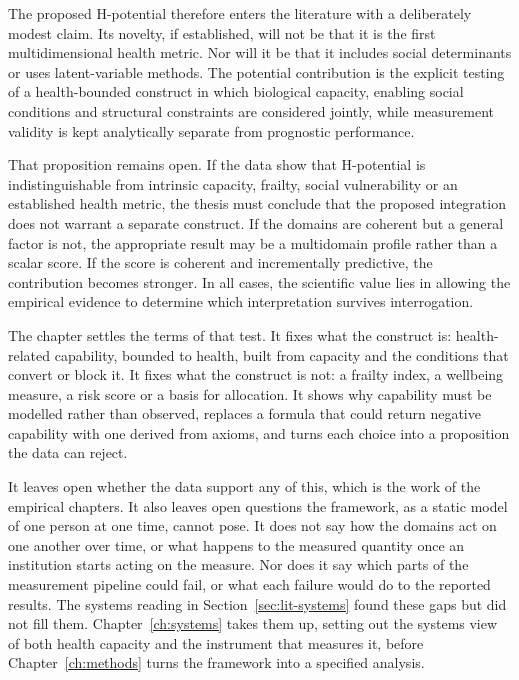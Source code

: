 The proposed H-potential therefore enters the literature with a deliberately modest claim. Its novelty, if established, will not be that it is the first multidimensional health metric. Nor will it be that it includes social determinants or uses latent-variable methods. The potential contribution is the explicit testing of a health-bounded construct in which biological capacity, enabling social conditions and structural constraints are considered jointly, while measurement validity is kept analytically separate from prognostic performance.

That proposition remains open. If the data show that H-potential is indistinguishable from intrinsic capacity, frailty, social vulnerability or an established health metric, the thesis must conclude that the proposed integration does not warrant a separate construct. If the domains are coherent but a general factor is not, the appropriate result may be a multidomain profile rather than a scalar score. If the score is coherent and incrementally predictive, the contribution becomes stronger. In all cases, the scientific value lies in allowing the empirical evidence to determine which interpretation survives interrogation.

The chapter settles the terms of that test. It fixes what the construct is: health-related capability, bounded to health, built from capacity and the conditions that convert or block it. It fixes what the construct is not: a frailty index, a wellbeing measure, a risk score or a basis for allocation. It shows why capability must be modelled rather than observed, replaces a formula that could return negative capability with one derived from axioms, and turns each choice into a proposition the data can reject.

It leaves open whether the data support any of this, which is the work of the empirical chapters. It also leaves open questions the framework, as a static model of one person at one time, cannot pose. It does not say how the domains act on one another over time, or what happens to the measured quantity once an institution starts acting on the measure. Nor does it say which parts of the measurement pipeline could fail, or what each failure would do to the reported results. The systems reading in Section~\ref{sec:lit-systems} found these gaps but did not fill them. Chapter~\ref{ch:systems} takes them up, setting out the systems view of both health capacity and the instrument that measures it, before Chapter~\ref{ch:methods} turns the framework into a specified analysis.
